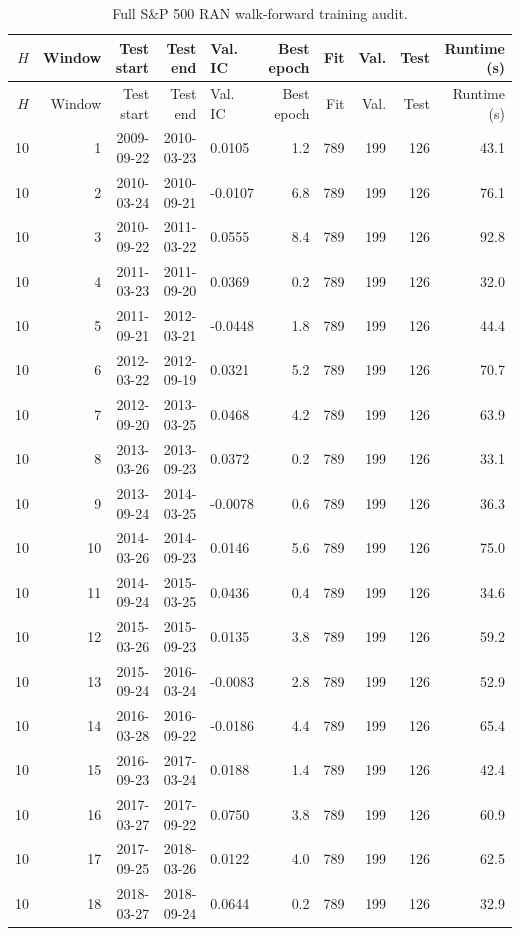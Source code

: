 \documentclass[10pt]{article}
\begin{document}
\begingroup\scriptsize\setlength{\tabcolsep}{2.5pt}
\begin{longtable}{rrrrlrrrrr}
\caption{Full S\&P 500 RAN walk-forward training audit.}\label{tab:sp500audit}\\
\toprule
$H$ & Window & Test start & Test end & Val. IC & Best epoch & Fit & Val. & Test & Runtime (s)\\
\midrule
\endfirsthead
\toprule
$H$ & Window & Test start & Test end & Val. IC & Best epoch & Fit & Val. & Test & Runtime (s)\\
\midrule
\endhead
10 & 1 & 2009-09-22 & 2010-03-23 & 0.0105 & 1.2 & 789 & 199 & 126 & 43.1 \\
10 & 2 & 2010-03-24 & 2010-09-21 & -0.0107 & 6.8 & 789 & 199 & 126 & 76.1 \\
10 & 3 & 2010-09-22 & 2011-03-22 & 0.0555 & 8.4 & 789 & 199 & 126 & 92.8 \\
10 & 4 & 2011-03-23 & 2011-09-20 & 0.0369 & 0.2 & 789 & 199 & 126 & 32.0 \\
10 & 5 & 2011-09-21 & 2012-03-21 & -0.0448 & 1.8 & 789 & 199 & 126 & 44.4 \\
10 & 6 & 2012-03-22 & 2012-09-19 & 0.0321 & 5.2 & 789 & 199 & 126 & 70.7 \\
10 & 7 & 2012-09-20 & 2013-03-25 & 0.0468 & 4.2 & 789 & 199 & 126 & 63.9 \\
10 & 8 & 2013-03-26 & 2013-09-23 & 0.0372 & 0.2 & 789 & 199 & 126 & 33.1 \\
10 & 9 & 2013-09-24 & 2014-03-25 & -0.0078 & 0.6 & 789 & 199 & 126 & 36.3 \\
10 & 10 & 2014-03-26 & 2014-09-23 & 0.0146 & 5.6 & 789 & 199 & 126 & 75.0 \\
10 & 11 & 2014-09-24 & 2015-03-25 & 0.0436 & 0.4 & 789 & 199 & 126 & 34.6 \\
10 & 12 & 2015-03-26 & 2015-09-23 & 0.0135 & 3.8 & 789 & 199 & 126 & 59.2 \\
10 & 13 & 2015-09-24 & 2016-03-24 & -0.0083 & 2.8 & 789 & 199 & 126 & 52.9 \\
10 & 14 & 2016-03-28 & 2016-09-22 & -0.0186 & 4.4 & 789 & 199 & 126 & 65.4 \\
10 & 15 & 2016-09-23 & 2017-03-24 & 0.0188 & 1.4 & 789 & 199 & 126 & 42.4 \\
10 & 16 & 2017-03-27 & 2017-09-22 & 0.0750 & 3.8 & 789 & 199 & 126 & 60.9 \\
10 & 17 & 2017-09-25 & 2018-03-26 & 0.0122 & 4.0 & 789 & 199 & 126 & 62.5 \\
10 & 18 & 2018-03-27 & 2018-09-24 & 0.0644 & 0.2 & 789 & 199 & 126 & 32.9 \\

\end{longtable}
\end{document}
